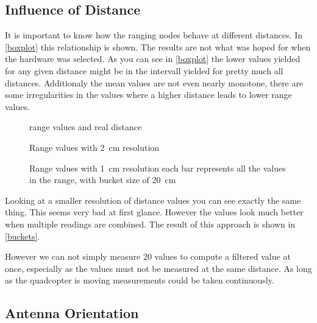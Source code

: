 \subsection{Influence of Distance}

It is important to know how the ranging nodes behave at different distances.
In \autoref{boxplot} this relationship is shown.
The results are not what was hoped for when the hardware was selected.
As you can see in \autoref{boxplot} the lower values yielded for any given distance might be in the intervall yielded for pretty much all distances.
Additionaly the mean values are not even nearly monotone, there are some irregularities in the values where a higher distance leads to lower range values.
\begin{landscape}
	\begin{figure}[h]
		\centering
		
		\caption{range values and real distance}
		\label{boxplot}
	\end{figure}

	\begin{figure}[h]
		\centering
		
		\caption{Range values with \SI{2}{\centi\metre} resolution}
		\label{resoulution}
	\end{figure}

	\begin{figure}[h]
		\centering
		
		\caption{Range values with \SI{1}{\centi\metre} resolution each bar represents all the values in the range, with bucket size of \SI{20}{\centi\metre}}
		\label{buckets}
	\end{figure}
\end{landscape}

Looking at a smaller resolution of distance values you can see exactly the same thing.
This seems very bad at first glance.
However the values look much better when multiple readings are combined.
The result of this approach is shown in \autoref{buckets}.

However we can not simply measure 20 values to compute a filtered value at once, especially as the values must not be measured at the same distance.
As long as the quadcopter is moving measurements could be taken continuously.

\subsection{Antenna Orientation}



